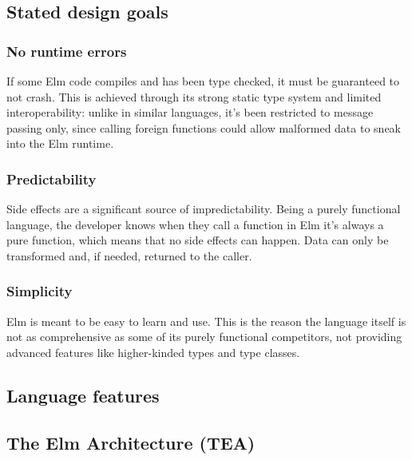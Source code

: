 \subsection{Stated design goals}

\subsubsection{No runtime errors}
If some Elm code compiles and has been type checked, it must be guaranteed to not crash. This is achieved through its strong static type system and limited interoperability: unlike in similar languages, it's been restricted to message passing only, since calling foreign functions could allow malformed data to sneak into the Elm runtime.

\subsubsection{Predictability}
Side effects are a significant source of impredictability. Being a purely functional language, the developer knows when they call a function in Elm it's always a pure function, which means that no side effects can happen. Data can only be transformed and, if needed, returned to the caller.

\subsubsection{Simplicity}
Elm is meant to be easy to learn and use. This is the reason the language itself is not as comprehensive as some of its purely functional competitors, not providing advanced features like higher-kinded types and type classes.

\subsection{Language features}
\subsection{The Elm Architecture (TEA)}
